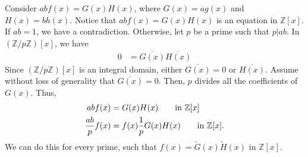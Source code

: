 \documentclass[8pt]{extarticle}
\newcommand{\Z}{\mathbb{Z}}
\begin{document}
  Consider $ab f(x) = G(x)H(x)$, where $G(x) = ag(x)$ and $H(x) = bh(x)$. Notice that $abf(x) = G(x)H(x)$ is an equation in $\Z[x]$. If $ab = 1$, we have a contradiction. Otherwise, let $p$ be a prime such that $p|ab$. In $(\Z/p\Z)[x]$, we have
  \begin{align*}
    0 &= \overline{G(x)}\overline{H(x)}
  \end{align*}
  Since $(\Z/p\Z)[x]$ is an integral domain, either $\overline{G(x)} = 0$ or $\overline{H(x)}$. Assume without loss of generality that $\overline{G(x)} = 0$. Then, $p$ divides all the coefficients of $G(x)$. Thus,
  \begin{align*}
    abf(x) &= G(x)H(x)\tag*{in $\Z[x]$}\\
    \frac{ab}{p}f(x) &= f(x)\frac{1}{p}G(x)H(x)\tag*{in $\Z[x]$.}
  \end{align*}
  We can do this for every prime, such that $f(x) = \tilde{G}(x)\tilde{H}(x)$ in $\Z[x]$.
\end{document}

